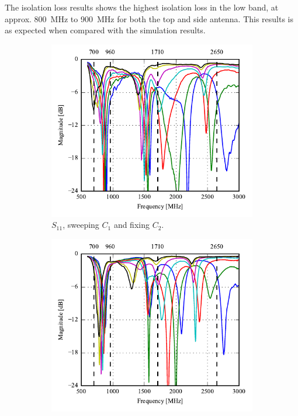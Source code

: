 The isolation loss results shows the highest isolation loss in the low band, at approx. \SI{800}{MHz} to \SI{900}{MHz} for both the top and side antenna. This results is as expected when compared with the simulation results.
    \begin{figure}[htbp]
   \begin{subfigure}[b]{0.49\linewidth}
        \centering
        \includegraphics{img/tech_sol/monopole/prototype_v2/meas_s11_csh1}
        \caption{$S_{11}$, sweeping $C_1$ and fixing $C_2$.}
        \label{fig:ant1_proto_meas_s11}
    \end{subfigure}
    \hfill
    \begin{subfigure}[b]{0.49\linewidth}
        \centering
        \includegraphics{img/tech_sol/monopole/prototype_v2/meas_s22_csh2}

\end{subfigure}
\end{figure}
